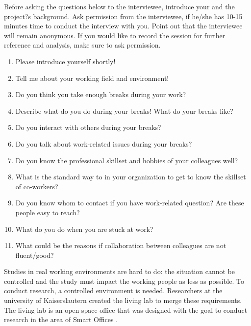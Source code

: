 \documentclass[english]{tktltiki}
\begin{document}
\pagebreak
\nocite{*}




\lastpage
\appendices
\pagestyle{empty}
\singlespacing

Before asking the questions below to the interviewee, introduce your and the project?s background. Ask permission from the interviewee, if he/she has 10-15 minutes time to conduct the interview with you. Point out that the interviewee will remain anonymous. If you would like to record the session for further reference and analysis, make sure to ask permission.

\begin{enumerate}
\item Please introduce yourself shortly!
\item Tell me about your working field and environment! 
\item Do you think you take enough breaks during your work? 
\item Describe what do you do during your breaks! What do your breaks like? 
\item Do you interact with others during your breaks? 
\item Do you talk about work-related issues during your breaks? 
\item Do you know the professional skillset and hobbies of your colleagues well?
\item What is the standard way to in your organization to get to know the skillset of co-workers? 
\item Do you know whom to contact if you have work-related question? Are these people easy to reach? 
\item What do you do when you are stuck at work? 
\item What could be the reasons if collaboration between colleagues are not fluent/good? 
\end{enumerate}



Studies in real working environments are hard to do: the situation cannot be controlled and the 
study must impact the working people as less as possible. To conduct research, a controlled 
environment is needed. Researchers at the university of Kaiserslautern created the living lab to 
merge these requirements. The living lab is an open space office that was designed with the goal to 
conduct research in the area of Smart Offices \cite{living-lab}.
\end{document}
